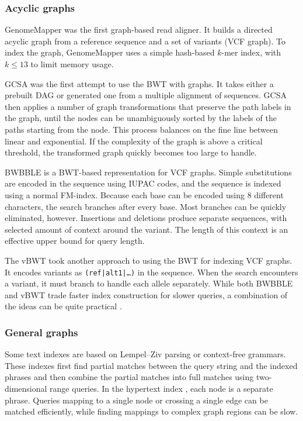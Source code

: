 \subsubsection{Acyclic graphs}

GenomeMapper \cite{Schneeberger_2009} was the first graph-based read aligner. It builds a directed acyclic graph from a reference sequence and a set of variants (VCF graph). To index the graph, GenomeMapper uses a simple hash-based $k$-mer index, with $k \le 13$ to limit memory usage.

GCSA \cite{Siren_2014} was the first attempt to use the BWT with graphs. It takes either a prebuilt DAG or generated one from a multiple alignment of sequences. GCSA then applies a number of graph transformations that preserve the path labels in the graph, until the nodes can be unambiguously sorted by the labels of the paths starting from the node. This process balances on the fine line between linear and exponential. If the complexity of the graph is above a critical threshold, the transformed graph quickly becomes too large to handle.

BWBBLE \cite{Huang_2013} is a BWT-based representation for VCF graphs. Simple substitutions are encoded in the sequence using IUPAC codes, and the sequence is indexed using a normal FM-index. Because each base can be encoded using 8 different characters, the search branches after every base. Most branches can be quickly eliminated, however. Insertions and deletions produce separate sequences, with selected amount of context around the variant. The length of this context is an effective upper bound for query length.

The vBWT \cite{Maciuca_2016} took another approach to using the BWT for indexing VCF graphs. It encodes variants as \texttt{(ref|alt1|\dots)} in the sequence. When the search encounters a variant, it must branch to handle each allele separately. While both BWBBLE and vBWT trade faster index construction for slower queries, a combination of the ideas can be quite practical \cite{Buechler_2019}.

\subsubsection{General graphs}

Some text indexes are based on Lempel--Ziv parsing or context-free grammars. These indexes first find partial matches between the query string and the indexed phrases and then combine the partial matches into full matches using two-dimensional range queries. In the hypertext index \cite{Thachuk_2013}, each node is a separate phrase. Queries mapping to a single node or crossing a single edge can be matched efficiently, while finding mappings to complex graph regions can be slow.

